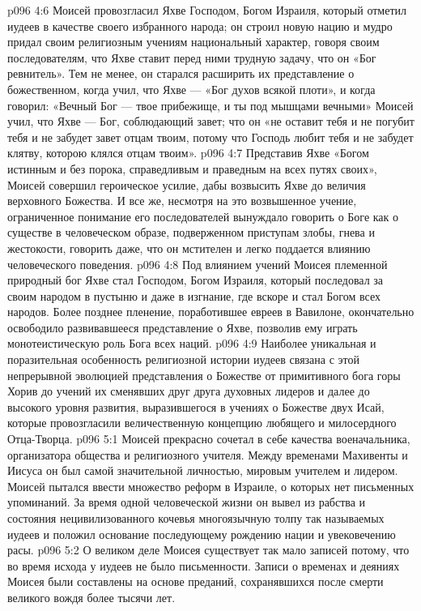 \vs p096 4:6 Моисей провозгласил Яхве Господом, Богом Израиля, который отметил иудеев в качестве своего избранного народа; он строил новую нацию и мудро придал своим религиозным учениям национальный характер, говоря своим последователям, что Яхве ставит перед ними трудную задачу, что он «Бог ревнитель». Тем не менее, он старался расширить их представление о божественном, когда учил, что Яхве --- «Бог духов всякой плоти», и когда говорил: «Вечный Бог --- твое прибежище, и ты под мышцами вечными» Моисей учил, что Яхве --- Бог, соблюдающий завет; что он «не оставит тебя и не погубит тебя и не забудет завет отцам твоим, потому что Господь любит тебя и не забудет клятву, которою клялся отцам твоим».
\vs p096 4:7 Представив Яхве «Богом истинным и без порока, справедливым и праведным на всех путях своих», Моисей совершил героическое усилие, дабы возвысить Яхве до величия верховного Божества. И все же, несмотря на это возвышенное учение, ограниченное понимание его последователей вынуждало говорить о Боге как о существе в человеческом образе, подверженном приступам злобы, гнева и жестокости, говорить даже, что он мстителен и легко поддается влиянию человеческого поведения.
\vs p096 4:8 Под влиянием учений Моисея племенной природный бог Яхве стал Господом, Богом Израиля, который последовал за своим народом в пустыню и даже в изгнание, где вскоре и стал Богом всех народов. Более позднее пленение, поработившее евреев в Вавилоне, окончательно освободило развивавшееся представление о Яхве, позволив ему играть монотеистическую роль Бога всех наций.
\vs p096 4:9 Наиболее уникальная и поразительная особенность религиозной истории иудеев связана с этой непрерывной эволюцией представления о Божестве от примитивного бога горы Хорив до учений их сменявших друг друга духовных лидеров и далее до высокого уровня развития, выразившегося в учениях о Божестве двух Исай, которые провозгласили величественную концепцию любящего и милосердного Отца\hyp{}Творца.
\vs p096 5:1 Моисей прекрасно сочетал в себе качества военачальника, организатора общества и религиозного учителя. Между временами Махивенты и Иисуса он был самой значительной личностью, мировым учителем и лидером. Моисей пытался ввести множество реформ в Израиле, о которых нет письменных упоминаний. За время одной человеческой жизни он вывел из рабства и состояния нецивилизованного кочевья многоязычную толпу так называемых иудеев и положил основание последующему рождению нации и увековечению расы.
\vs p096 5:2 О великом деле Моисея существует так мало записей потому, что во время исхода у иудеев не было письменности. Записи о временах и деяниях Моисея были составлены на основе преданий, сохранявшихся после смерти великого вождя более тысячи лет.
